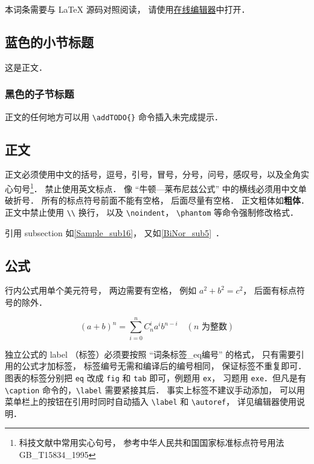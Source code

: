 
\begin{issues}
\issueDraft
\issueTODO
\issueMissDepend
\issueAbstract
\issueNeedCite
\end{issues}


本词条需要与 LaTeX 源码对照阅读， 请使用\href{https://wuli.wiki/editor}{在线编辑器}中打开．

\subsection{蓝色的小节标题}
这是正文．
\subsubsection{黑色的子节标题}
正文的任何地方可以用 \verb|\addTODO{}| 命令插入未完成提示．

\subsection{正文}\label{Sample_sub16}
正文必须使用中文的括号，逗号，引号，冒号，分号，问号，感叹号，以及全角实心句号\footnote{科技文献中常用实心句号， 参考中华人民共和国国家标准标点符号用法 GB\_T15834\_1995}． 禁止使用英文标点． 像 “牛顿—莱布尼兹公式” 中的横线必须用中文单破折号． 所有的标点符号前面不能有空格， 后面尽量有空格． 正文粗体如\textbf{粗体}． 正文中禁止使用 \verb|\\| 换行， 以及 \verb|\noindent|， \verb|\phantom| 等命令强制修改格式．

引用 subsection 如\autoref{Sample_sub16}， 又如\autoref{BiNor_sub5}~．

\subsection{公式}
行内公式用单个美元符号， 两边需要有空格， 例如 $a^2+b^2=c^2$， 后面有标点符号的除外．

\begin{equation}\label{Sample_eq1}
(a+b)^n = \sum_{i=0}^n C_n^i a^i b^{n-i} \quad (\text{$n$ 为整数})
\end{equation}

独立公式的 label （标签）必须要按照 “词条标签\_eq编号” 的格式， 只有需要引用的公式才加标签， 标签编号无需和编译后的编号相同， 保证标签不重复即可． 图表的标签分别把 \verb|eq| 改成 \verb|fig| 和 \verb|tab| 即可，例题用 \verb|ex|， 习题用 \verb|exe|．但凡是有 \verb|\caption| 命令的，\verb|\label| 需要紧接其后． 事实上标签不建议手动添加， 可以用菜单栏上的按钮在引用时同时自动插入 \verb|\label| 和 \verb|\autoref|， 详见编辑器使用说明．


